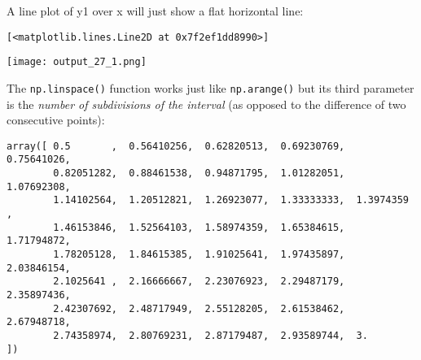 \documentclass[english,serif,mathserif,xcolor=pdftex,dvipsnames,table]{beamer}
\begin{document}
A line plot of y1 over x will just show a flat horizontal line:

\begin{Shaded}
\begin{Highlighting}[]
\end{Highlighting}
\end{Shaded}

\begin{verbatim}
[<matplotlib.lines.Line2D at 0x7f2ef1dd8990>]
\end{verbatim}

\texttt{[image: output\_27\_1.png]}

The \texttt{np.linspace()} function works just like \texttt{np.arange()}
but its third parameter is the \emph{number of subdivisions of the
interval} (as opposed to the difference of two consecutive points):

\begin{Shaded}
\begin{Highlighting}[]
\OperatorTok{=} \NormalTok{, }\NormalTok{, }
\end{Highlighting}
\end{Shaded}

\begin{Shaded}
\begin{Highlighting}[]
\end{Highlighting}
\end{Shaded}

\begin{verbatim}
array([ 0.5       ,  0.56410256,  0.62820513,  0.69230769,  0.75641026,
        0.82051282,  0.88461538,  0.94871795,  1.01282051,  1.07692308,
        1.14102564,  1.20512821,  1.26923077,  1.33333333,  1.3974359 ,
        1.46153846,  1.52564103,  1.58974359,  1.65384615,  1.71794872,
        1.78205128,  1.84615385,  1.91025641,  1.97435897,  2.03846154,
        2.1025641 ,  2.16666667,  2.23076923,  2.29487179,  2.35897436,
        2.42307692,  2.48717949,  2.55128205,  2.61538462,  2.67948718,
        2.74358974,  2.80769231,  2.87179487,  2.93589744,  3.        ])
\end{verbatim}

\begin{Shaded}
\begin{Highlighting}[]
\end{Highlighting}
\end{Shaded}
\end{document}
